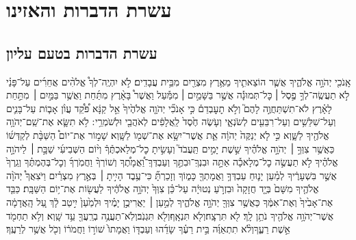 \documentclass[11pt, openany]{book}
\newcommand{\texttitle}{ספר  דברים}
\begin{document}
	

	
\clearpage
\mainmatter

\setmainheader



\chapter*{עשרת הדברות והאזינו}

\fancyhead[C]{\texttitle}

\section*{עשרת הדברות בטעם עליון}

\label{elyon}

אָֽנֹכִ֖י יְהֹוָ֣ה אֱלֹהֶ֑יךָ אֲשֶׁ֧ר הוֹצֵאתִ֛יךָ מֵאֶ֥רֶץ מִצְרַ֖יִם מִבֵּ֥ית עֲבָדִֽים׃ לֹ֣א יִהְיֶֽה־לְךָ֩ אֱלֹהִ֨ים אֲחֵרִ֜ים עַל־פָּנַ֗י לֹ֣א תַעֲשֶֽׂה־לְךָ֣ פֶ֣סֶל ׀ כׇּל־תְּמוּנָ֡ה אֲשֶׁ֣ר בַּשָּׁמַ֣יִם ׀ מִמַּ֡עַל וַאֲשֶׁר֩ בָּאָ֨רֶץ מִתַּ֜חַת וַאֲשֶׁ֥ר בַּמַּ֣יִם ׀ מִתַּ֣חַת לָאָ֗רֶץ לֹא־תִשְׁתַּחֲוֶ֣ה לָהֶם֮ וְלֹ֣א תׇעׇבְדֵם֒ כִּ֣י אָנֹכִ֞י יְהֹוָ֤ה אֱלֹהֶ֙יךָ֙ אֵ֣ל קַנָּ֔א פֹּ֠קֵ֠ד עֲוֺ֨ן אָב֧וֹת עַל־בָּנִ֛ים וְעַל־שִׁלֵּשִׁ֥ים וְעַל־רִבֵּעִ֖ים לְשֹׂנְאָ֑י וְעֹ֤שֶׂה חֶ֙סֶד֙ לַֽאֲלָפִ֔ים לְאֹהֲבַ֖י וּלְשֹׁמְרֵ֥י ׃\setuma
לֹ֥א תִשָּׂ֛א אֶת־שֵֽׁם־יְהֹוָ֥ה אֱלֹהֶ֖יךָ לַשָּׁ֑וְא כִּ֣י לֹ֤א יְנַקֶּה֙ יְהֹוָ֔ה אֵ֛ת אֲשֶׁר־יִשָּׂ֥א אֶת־שְׁמ֖וֹ לַשָּֽׁוְא׃
שָׁמ֣וֹר אֶת־יוֹם֩ הַשַּׁבָּ֨ת לְקַדְּשׁ֜וֹ כַּאֲשֶׁ֥ר צִוְּךָ֣ ׀ יְהֹוָ֣ה אֱלֹהֶ֗יךָ שֵׁ֣שֶׁת יָמִ֣ים תַּֽעֲבֹד֮ וְעָשִׂ֣יתָ כׇל־מְלַאכְתֶּ֒ךָ֒ וְי֨וֹם הַשְּׁבִיעִ֜י שַׁבָּ֣ת ׀ לַיהֹוָ֣ה אֱלֹהֶ֗יךָ לֹ֣א תַעֲשֶׂ֣ה כׇל־מְלָאכָ֡ה אַתָּ֣ה וּבִנְךָֽ־וּבִתֶּ֣ךָ וְעַבְדְּךָֽ־וַ֠אֲמָתֶ֠ךָ וְשׁוֹרְךָ֨ וַחֲמֹֽרְךָ֜ וְכׇל־בְּהֶמְתֶּ֗ךָ וְגֵֽרְךָ֙ אֲשֶׁ֣ר בִּשְׁעָרֶ֔יךָ לְמַ֗עַן יָנ֛וּחַ עַבְדְּךָ֥ וַאֲמָתְךָ֖ כָּמ֑וֹךָ וְזָכַרְתָּ֞ כִּי־עֶ֥בֶד הָיִ֣יתָ ׀ בְּאֶ֣רֶץ מִצְרַ֗יִם וַיֹּצִאֲךָ֩ יְהֹוָ֨ה אֱלֹהֶ֤יךָ מִשָּׁם֙ בְּיָ֤ד חֲזָקָה֙ וּבִזְרֹ֣עַ נְטוּיָ֔ה עַל־כֵּ֗ן צִוְּךָ֙ יְהֹוָ֣ה אֱלֹהֶ֔יךָ לַעֲשׂ֖וֹת אֶת־י֥וֹם הַשַּׁבָּֽת׃\setuma
כַּבֵּ֤ד אֶת־אָבִ֙יךָ֙ וְאֶת־אִמֶּ֔ךָ כַּאֲשֶׁ֥ר צִוְּךָ֖ יְהֹוָ֣ה אֱלֹהֶ֑יךָ לְמַ֣עַן ׀ יַאֲרִיכֻ֣ן יָמֶ֗יךָ וּלְמַ֙עַן֙ יִ֣יטַב לָ֔ךְ עַ֚ל הָֽאֲדָמָ֔ה אֲשֶׁר־יְהֹוָ֥ה אֱלֹהֶ֖יךָ נֹתֵ֥ן לָֽךְ׃\setuma
לֹ֖א תִּרְצָֽח׃\setuma וְלֹ֖א תִּנְאָֽף׃\setuma וְלֹ֖א תִּגְנֹֽב׃\setuma וְלֹֽא־תַעֲנֶ֥ה בְרֵֽעֲךָ֖ עֵ֥ד שָֽׁוְא׃
וְלֹ֥א תַחְמֹ֖ד אֵ֣שֶׁת רֵעֶ֑ךָ\setuma וְלֹ֨א תִתְאַוֶּ֜ה בֵּ֣ית רֵעֶ֗ךָ שָׂדֵ֜הוּ וְעַבְדּ֤וֹ וַאֲמָתוֹ֙ שׁוֹר֣וֹ וַחֲמֹר֔וֹ וְכֹ֖ל אֲשֶׁ֥ר לְרֵעֶֽךָ׃ \setuma
\end{document}
